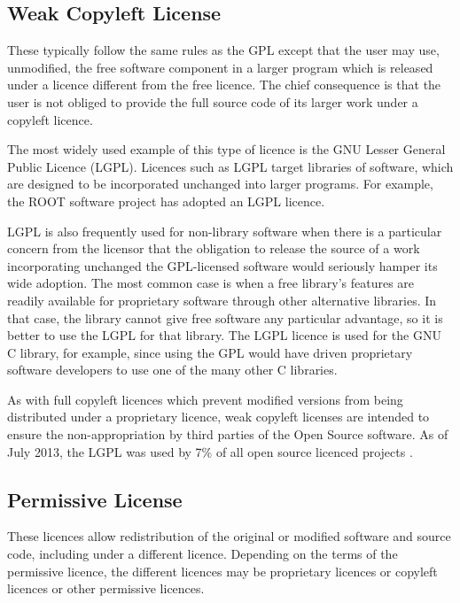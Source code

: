 \documentclass[12pt,a4paper]{article}
\begin{document}
\subsection{Weak Copyleft License}
\label{sec:WeakCopyleft}

These typically follow the same rules as the GPL except that the user may use, unmodified, the free software component in a larger program which is released under a licence different from the free licence. The chief consequence is that the user is not obliged to provide the full source code of its larger work under a copyleft licence.

The most widely used example of this type of licence is the GNU Lesser General Public Licence (LGPL). Licences such as LGPL target libraries of software, which are designed to be incorporated unchanged into larger programs. For example, the ROOT software project \cite{[5]} has adopted an LGPL licence. 

LGPL is also frequently used for non-library software when there is a particular concern from the licensor that the obligation to release the source of a work incorporating unchanged the GPL-licensed software would seriously hamper its wide adoption. The most common case is when a free library's features are readily available for proprietary software through other alternative libraries. In that case, the library cannot give free software any particular advantage, so it is better to use the LGPL for that library. The LGPL licence is used for the GNU C library, for example, since using the GPL would have driven proprietary software developers to use one of the many other C libraries.

As with full copyleft licences which prevent modified versions from being distributed under a proprietary licence, weak copyleft licenses are intended to ensure the non-appropriation by third parties of the Open Source software. 
As of July 2013, the LGPL was used by 7\% of all open source licenced projects \cite{[6]}.

\subsection{Permissive License}
\label{sec:PermissiveLicense}

These licences allow redistribution of the original or modified software and source code, including under a different licence.  Depending on the terms of the permissive licence,  the different licences may be proprietary licences or copyleft licences or other permissive licences. 
\end{document}

